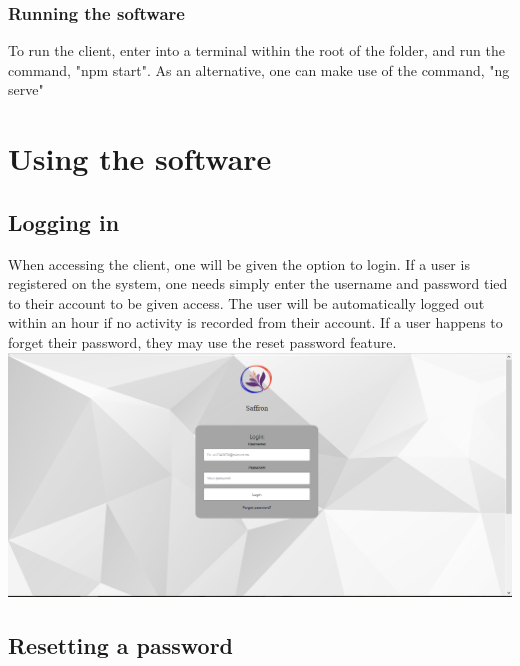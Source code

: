 \documentclass[a4paper,12pt]{article}
\begin{document}
     		\subsubsection {Running the software}
     		
	     	To run the client, enter into a terminal within the root of the folder, and run the command, "npm start". As an alternative, one can make use of the command, "ng serve"
    
    \pagebreak
    
    \section{Using the software}
    
    	\subsection{Logging in}
    	
    	When accessing the client, one will be given the option to login. If a user is registered on the system, one needs simply enter the username and password tied to their account to be given access. The user will be automatically logged out within an hour if no activity is recorded from their account. If a user happens to forget their password, they may use the reset password feature.\\[1.0cm]
        
        \includegraphics[width=1\textwidth]{../images/screens/login.PNG}\\[1.0cm] 
    	
   		\subsection{Resetting a password}
    	
\end{document}

